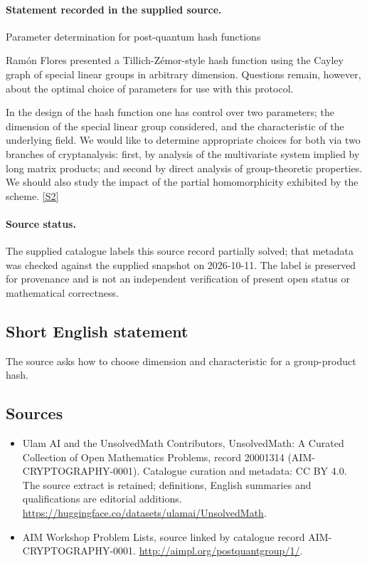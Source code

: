 \documentclass[11pt]{article}
\begin{document}
\paragraph{Statement recorded in the supplied source.}
Parameter determination for post-quantum hash functions

Ramón Flores presented a Tillich-Zémor-style hash function using the Cayley graph of special linear groups in arbitrary dimension. Questions remain, however, about the optimal choice of parameters for use with this protocol.

In the design of the hash function one has control over two parameters; the dimension of the special linear group considered, and the characteristic of the underlying field. We would like to determine appropriate choices for both via two branches of cryptanalysis: first, by analysis of the multivariate system implied by long matrix products; and second by direct analysis of group-theoretic properties. We should also study the impact of the partial homomorphicity exhibited by the scheme. \href{http://aimpl.org/postquantgroup/1/}{[S2]}
\paragraph{Source status.}
The supplied catalogue labels this source record partially solved; that metadata was checked against the supplied snapshot on 2026-10-11. The label is preserved for provenance and is not an independent verification of present open status or mathematical correctness.
\subsection{Short English statement}
The source asks how to choose dimension and characteristic for a group-product hash.
\subsection{Sources}
\begin{itemize}
\item[S1] Ulam AI and the UnsolvedMath Contributors, UnsolvedMath: A Curated Collection of Open Mathematics Problems, record 20001314 (AIM-CRYPTOGRAPHY-0001). Catalogue curation and metadata: CC BY 4.0. The source extract is retained; definitions, English summaries and qualifications are editorial additions.
\url{https://huggingface.co/datasets/ulamai/UnsolvedMath}.
\item[S2] AIM Workshop Problem Lists, source linked by catalogue record AIM-CRYPTOGRAPHY-0001.
\url{http://aimpl.org/postquantgroup/1/}.
\end{itemize}
\end{document}
